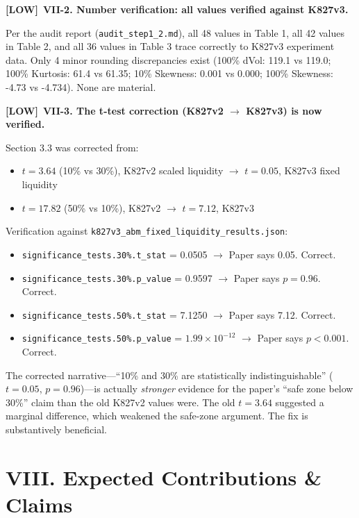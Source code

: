 \documentclass[12pt,a4paper]{article}
\newcommand{\LOW}{\textbf{\textcolor{okgreen}{[LOW]}}}
\begin{document}
\medskip

\LOW\ \textbf{VII-2. Number verification: all values verified against K827v3.}

Per the audit report (\texttt{audit\_step1\_2.md}), all 48 values in Table 1, all 42 values in Table 2, and all 36 values in Table 3 trace correctly to K827v3 experiment data. Only 4 minor rounding discrepancies exist (100\% dVol: 119.1 vs 119.0; 100\% Kurtosis: 61.4 vs 61.35; 10\% Skewness: 0.001 vs 0.000; 100\% Skewness: -4.73 vs -4.734). None are material.

\medskip

\LOW\ \textbf{VII-3. The t-test correction (K827v2 $\to$ K827v3) is now verified.}

Section 3.3 was corrected from:
\begin{itemize}
  \item $t = 3.64$ (10\% vs 30\%), K827v2 scaled liquidity $\to$ $t = 0.05$, K827v3 fixed liquidity
  \item $t = 17.82$ (50\% vs 10\%), K827v2 $\to$ $t = 7.12$, K827v3
\end{itemize}

Verification against \texttt{k827v3\_abm\_fixed\_liquidity\_results.json}:
\begin{itemize}
  \item \texttt{significance\_tests.30\%.t\_stat} = 0.0505 $\to$ Paper says 0.05. \textcolor{okgreen}{Correct.}
  \item \texttt{significance\_tests.30\%.p\_value} = 0.9597 $\to$ Paper says $p = 0.96$. \textcolor{okgreen}{Correct.}
  \item \texttt{significance\_tests.50\%.t\_stat} = 7.1250 $\to$ Paper says 7.12. \textcolor{okgreen}{Correct.}
  \item \texttt{significance\_tests.50\%.p\_value} = $1.99 \times 10^{-12}$ $\to$ Paper says $p < 0.001$. \textcolor{okgreen}{Correct.}
\end{itemize}

The corrected narrative---``10\% and 30\% are statistically indistinguishable'' ($t = 0.05$, $p = 0.96$)---is actually \emph{stronger} evidence for the paper's ``safe zone below 30\%'' claim than the old K827v2 values were. The old $t = 3.64$ suggested a marginal difference, which weakened the safe-zone argument. The fix is substantively beneficial.


\section*{VIII. Expected Contributions \& Claims}
\end{document}
